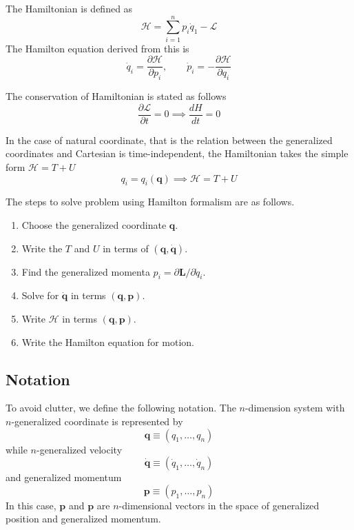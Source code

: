 \documentclass[../../../main.tex]{subfiles}
\begin{document}
The Hamiltonian is defined as
\begin{equation*}
	\mathcal{H}=\sum_{i=1}^{n}p_i\dot{q}_1-\mathcal{L}
\end{equation*}
The Hamilton equation derived from this is
\begin{equation*}
	\dot{q}_i=\frac{\partial\mathcal{H}}{\partial p_i},\qquad\dot{p}_i=-\frac{\partial\mathcal{H}}{\partial q_i}
\end{equation*}

The conservation of Hamiltonian is stated as follows
\begin{equation*}
	\frac{\partial\mathcal{L}}{\partial t}=0\implies\frac{dH}{dt}=0
\end{equation*}

In the case of natural coordinate, that is the relation between the generalized coordinates and Cartesian is time-independent, the Hamiltonian takes the simple form $\mathcal{H}=T+U$
\begin{equation*}
	q_i=q_i(\mathbf{q})\implies\mathcal{H}=T+U
\end{equation*}

The steps to solve problem using Hamilton formalism are as follows.
\begin{enumerate}
    \item Choose the generalized coordinate $\mathbf{q}$.
    \item Write the $T$ and $U$ in terms of $(\mathbf{q},\dot{\mathbf{q}})$.
    \item Find the generalized momenta $p_i=\partial\mathbf{L}/\partial \dot{q}_i$.
    \item Solve for $\dot{\mathbf{q}}$ in terms $(\mathbf{q},\mathbf{p})$.
    \item Write $\mathcal{H}$ in terms $(\mathbf{q},\mathbf{p})$.
    \item Write the Hamilton equation for motion.
\end{enumerate}

\subsection*{Notation}
To avoid clutter, we define the following notation.
The $n$-dimension system with $n$-generalized coordinate is represented by
\begin{equation*}
	\mathbf{q}\equiv(q_1,\dots,q_n)
\end{equation*}
while $n$-generalized velocity
\begin{equation*}
	\dot{\mathbf{q}}\equiv(\dot{q}_1,\dots,\dot{q}_n)
\end{equation*}
and generalized momentum
\begin{equation*}
	\mathbf{p}\equiv(p_1,\dots,p_n)
\end{equation*}
In this case, $\mathbf{p}$ and $\mathbf{p}$ are $n$-dimensional vectors in the space of generalized position and generalized momentum.
\end{document}
